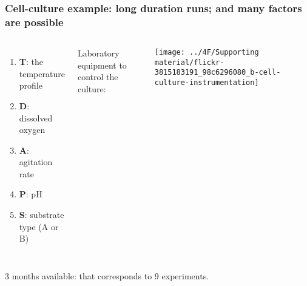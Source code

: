 \begin{frame}\frametitle{Cell-culture example: long duration runs; and many factors are possible}
	\begin{columns}[c]
			\begin{enumerate}
				\item	\textbf{T}: the temperature profile
				\item	\textbf{D}: dissolved oxygen
				\item	\textbf{A}: agitation rate
				\item	\textbf{P}: pH
				\item	\textbf{S}: substrate type (A or B)
			\end{enumerate}
		
			{\color{blue} \small Laboratory equipment to control the culture:} 
			
			\vspace{0.2cm}
			
			\centerline{\texttt{[image: ../4F/Supporting material/flickr-3815183191\_98c6296080\_b-cell-culture-instrumentation]}}
	\end{columns}

	\vfill
	3 months available: {\color{myOrange} that corresponds to 9 experiments}.
	
\end{frame}

